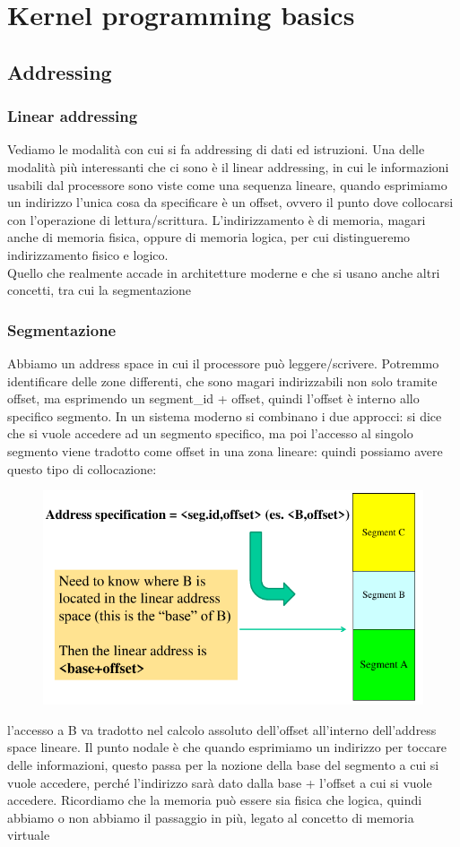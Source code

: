 \documentclass[12pt, oneside]{extbook}
\begin{document}
\chapter{Kernel programming basics}
\section{Addressing}
\subsection{Linear addressing}
Vediamo le modalità con cui si fa addressing di dati ed istruzioni. Una delle modalità più interessanti che ci sono è il linear addressing, in cui le informazioni usabili dal processore sono viste come una sequenza lineare, quando esprimiamo un indirizzo l'unica cosa da specificare è un offset, ovvero il punto dove collocarsi con l'operazione di lettura/scrittura. L'indirizzamento è di memoria, magari anche di memoria fisica, oppure di memoria logica, per cui distingueremo indirizzamento fisico e logico.\\ Quello che realmente accade in architetture moderne e che si usano anche altri concetti, tra cui la segmentazione
\subsection{Segmentazione}
Abbiamo un address space in cui il processore può leggere/scrivere. Potremmo identificare delle zone differenti, che sono magari indirizzabili non solo tramite offset, ma esprimendo un segment\_id + offset, quindi l'offset è interno allo specifico segmento. In un sistema moderno si combinano i due approcci: si dice che si vuole accedere ad un segmento specifico, ma poi l'accesso al singolo segmento viene tradotto come offset in una zona lineare: quindi possiamo avere questo tipo di collocazione:
\begin{figure}[!h]
	\includegraphics[scale=0.3]{immagini/la_seg.png}
\end{figure}
l'accesso a B va tradotto nel calcolo assoluto dell'offset all'interno dell'address space lineare. Il punto nodale è che quando esprimiamo un indirizzo per toccare delle informazioni, questo passa per la nozione della base del segmento a cui si vuole accedere, perché l'indirizzo sarà dato dalla base + l'offset a cui si vuole accedere. Ricordiamo che la memoria può essere sia fisica che logica, quindi abbiamo o non abbiamo il passaggio in più, legato al concetto di memoria virtuale
\end{document}
